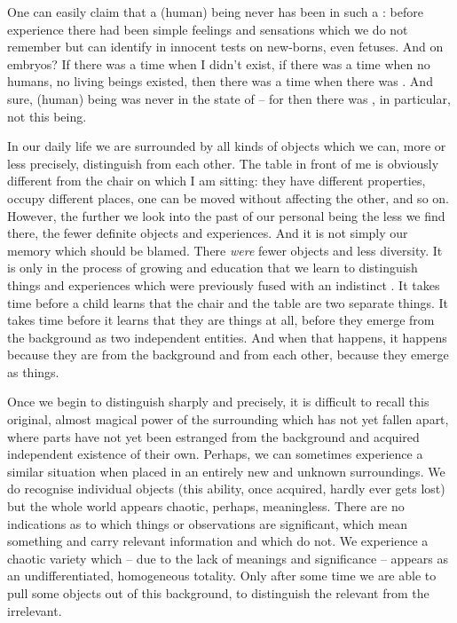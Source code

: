 
\pa One can easily claim that a (human) being never has been in such a
: before experience there had been simple
feelings and sensations which we do not remember but can identify in innocent
tests on new-borns, even fetuses.  And on embryos?  If there was a time when I
didn't exist, if there was a time when no humans, no living beings existed, then
there was a time when there was .  And sure, (human) being was never
in the state of  -- for then there was , in
particular, not this being.

In our daily life we are surrounded by all kinds of objects which we can, more
or less precisely, distinguish from each other.  The table in front of me is
obviously different from the chair on which I am sitting: they have different
properties, occupy different places, one can be moved without affecting the
other, and so on.  However, the further we look into the past of our personal
being the less we find there, the fewer definite objects and experiences.  And
it is not simply our memory which should be blamed.  There {\em were} fewer
objects and less diversity.  It is only in the process of growing and education
that we learn to distinguish things and experiences which were previously fused
with an indistinct .  It takes time before a child learns that
the chair and the table are two separate things.  It takes time before it learns
that they are things at all, before they emerge from the 
background as two independent entities.  And when that happens, it happens
because they are  from the background and from each other,
because they emerge as  things.

Once we begin to distinguish sharply and precisely, it is difficult to recall
this original, almost magical power of the surrounding which has not yet fallen
apart, where parts have not yet been estranged from the background and acquired
independent existence of their own.  Perhaps,
we can sometimes experience a similar situation when placed in an
entirely new and unknown surroundings.  We do recognise individual objects (this
ability, once acquired, hardly ever gets lost) but the whole world appears
chaotic, perhaps, meaningless.  There are no indications as to which things or
observations are significant, which mean something and carry relevant
information and which do not.  We experience a chaotic variety which -- due to
the lack of meanings and significance -- appears as an undifferentiated,
homogeneous totality.  Only after some time we are able to pull some objects out
of this background, to distinguish the relevant from the irrelevant.


